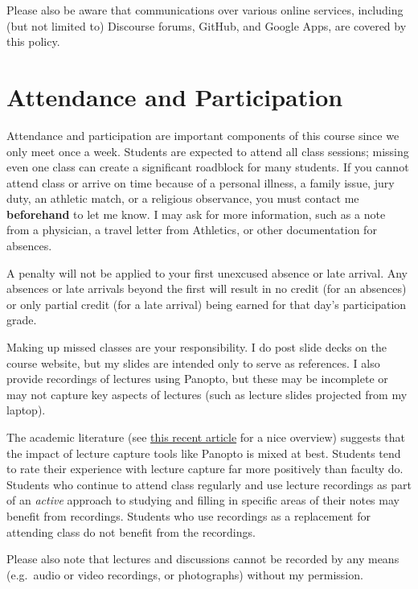 \documentclass[]{book}
\begin{document}
Please also be aware that communications over various online services, including (but not limited to) Discourse forums, GitHub, and Google Apps, are covered by this policy.

\hypertarget{attendance-and-participation}{%
\section{Attendance and Participation}\label{attendance-and-participation}}

Attendance and participation are important components of this course since we only meet once a week. Students are expected to attend all class sessions; missing even one class can create a significant roadblock for many students. If you cannot attend class or arrive on time because of a personal illness, a family issue, jury duty, an athletic match, or a religious observance, you must contact me \textbf{beforehand} to let me know. I may ask for more information, such as a note from a physician, a travel letter from Athletics, or other documentation for absences.

A penalty will not be applied to your first unexcused absence or late arrival. Any absences or late arrivals beyond the first will result in no credit (for an absences) or only partial credit (for a late arrival) being earned for that day's participation grade.

Making up missed classes are your responsibility. I do post slide decks on the course website, but my slides are intended only to serve as references. I also provide recordings of lectures using Panopto, but these may be incomplete or may not capture key aspects of lectures (such as lecture slides projected from my laptop).

The academic literature (see \href{https://link.springer.com/article/10.1007/s10734-018-0275-9}{this recent article} for a nice overview) suggests that the impact of lecture capture tools like Panopto is mixed at best. Students tend to rate their experience with lecture capture far more positively than faculty do. Students who continue to attend class regularly and use lecture recordings as part of an \emph{active} approach to studying and filling in specific areas of their notes may benefit from recordings. Students who use recordings as a replacement for attending class do not benefit from the recordings.

Please also note that lectures and discussions cannot be recorded by any means (e.g.~audio or video recordings, or photographs) without my permission.
\end{document}
